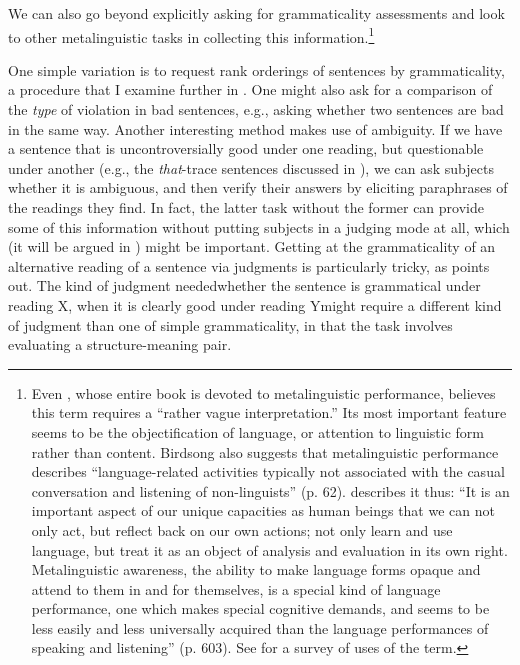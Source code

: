 We can also go beyond explicitly asking for grammaticality assessments and look to other metalinguistic tasks in collecting this information.\footnote{Even \citet{Birdsong1989}, whose entire book is devoted to metalinguistic performance, believes this term requires a ``rather vague interpretation.'' Its most important feature seems to be the objectification of language, or attention to linguistic form rather than content. Birdsong also suggests that metalinguistic performance describes ``language-related activities typically not associated with the casual conversation and listening of non-linguists'' (p. 62). \citet{Cazden1976} describes it thus: ``It is an important aspect of our unique capacities as human beings that we can not only act, but reflect back
on our own actions; not only learn and use language, but treat it as an object of analysis and evaluation in its own right. Metalinguistic awareness, the ability to make language forms opaque and attend to them in and for themselves, is a special kind of language performance, one which makes special cognitive demands, and seems to be less easily and less universally acquired than the language performances of speaking and listening'' (p. 603). See \citet{Gombert1992} for a survey of uses of the term.}

 One simple variation is to request rank orderings of sentences by grammaticality, a procedure
that I examine further in . One might also ask for a comparison of the \textit{type} of violation in bad sentences, e.g., asking whether two sentences are bad in the same way. Another interesting method makes use of ambiguity. If we have a sentence that is uncontroversially good under one reading, but questionable under another (e.g., the \textit{that}-trace sentences discussed in ), we can ask subjects whether it is ambiguous, and then verify their answers by eliciting paraphrases of the readings they find. In fact, the latter task without the former can provide some of this information without putting subjects in a judging mode at all, which (it will be argued in ) might be important. Getting at the grammaticality of an alternative reading of a sentence via judgments is particularly tricky, as \citet{Householder1973} points out. The kind of judgment needed\schdash{}whether the sentence is grammatical under reading X, when it is clearly good under reading Y\schdash{}might require a different kind of judgment than one of simple grammaticality, in that the task involves evaluating a structure-meaning pair.

